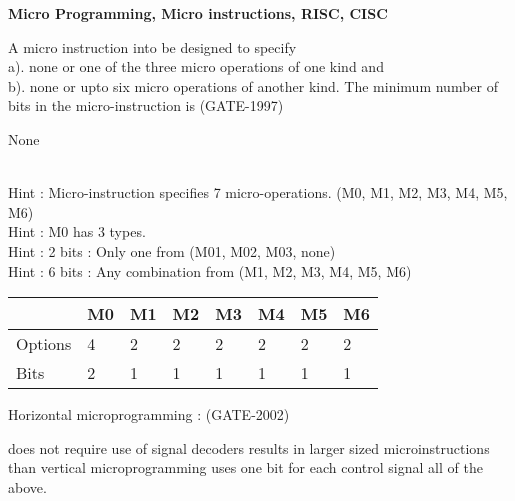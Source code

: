 
\centerline{\textbf{ \LARGE Micro Programming, Micro instructions, RISC, CISC}}


\begin{questyle}
  \question  A micro instruction into be designed to specify \\ a). none or one of the three micro
             operations of one kind and \\b). none or upto six micro operations of another kind.
             The minimum number of bits in the micro-instruction is  (GATE-1997)

  \begin{oneparchoices}
    \choice         None
  \end{oneparchoices}
  \\ Hint : Micro-instruction specifies 7 micro-operations. (M0, M1, M2, M3, M4, M5, M6)
  \\ Hint : M0 has 3 types.
  \\ Hint : 2 bits : Only one from (M01, M02, M03, none)
  \\ Hint : 6 bits : Any combination from (M1, M2, M3, M4, M5, M6)

    \begin{myTableStyle} \begin{tabular}{ |m{1cm}|m{0.2cm}|m{0.2cm}|m{0.2cm}|m{0.2cm}|m{0.2cm}|m{0.2cm}|m{0.2cm}| } \hline
                & M0 & M1 & M2 & M3 & M4 & M5 & M6 \\ \hline
        Options & 4  & 2  & 2  & 2  & 2  & 2  & 2 \\ \hline
        Bits    & 2  & 1  & 1  & 1  & 1  & 1  & 1 \\ \hline
    \end{tabular} \end{myTableStyle} \vspace{0.08in}
\end{questyle}

\begin{questyle}
  \question  Horizontal microprogramming :  (GATE-2002)

  \begin{choices}
    \choice         does not require use of signal decoders
    \choice         results in larger sized microinstructions than vertical microprogramming
    \choice         uses one bit for each control signal
    \CorrectChoice  all of the above.
  \end{choices}
\end{questyle}


